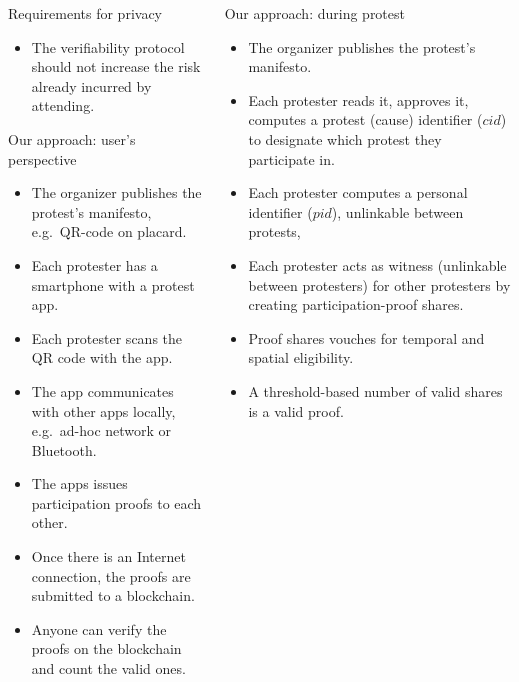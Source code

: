 \begin{columns}[t]
\begin{column}{0.32\linewidth}
    \begin{blueblock}{Requirements for privacy}
      \begin{itemize}
        \item The verifiability protocol should not increase the risk already 
          incurred by attending.
      \end{itemize}
    \end{blueblock}

    \begin{greenblock}{Our approach: user's perspective}
      \begin{itemize}
        \item The organizer publishes the protest's manifesto, e.g.\ QR-code on 
          placard.
        \item Each protester has a smartphone with a protest app.
        \item Each protester scans the QR code with the app.
        \item The app communicates with other apps locally, e.g.\ ad-hoc network 
          or Bluetooth.
        \item The apps issues participation proofs to each other.
        \item Once there is an Internet connection, the proofs are submitted to 
          a blockchain.
        \item Anyone can verify the proofs on the blockchain and count the valid 
          ones.
      \end{itemize}
    \end{greenblock}

  \end{column}

  \hfill

  \begin{column}{0.32\linewidth}

    \begin{greenblock}{Our approach: during protest}
      \begin{itemize}
        \item The organizer publishes the protest's manifesto.
        \item Each protester reads it, approves it, computes a protest (cause) 
          identifier (\(cid\)) to designate which protest they participate in.
        \item Each protester computes a personal identifier (\(pid\)), 
          unlinkable between protests,
        \item Each protester acts as witness (unlinkable between protesters) for 
          other protesters by creating participation-proof shares.
        \item Proof shares vouches for temporal and spatial eligibility.
        \item A threshold-based number of valid shares is a valid proof.
      \end{itemize}
    \end{greenblock}


\end{column}
\end{columns}
